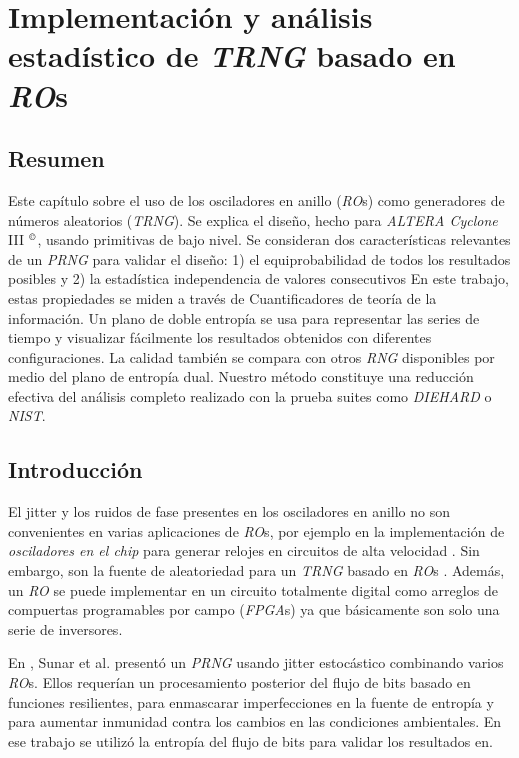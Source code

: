 \section{Implementación y análisis estadístico de \emph{TRNG} basado en \emph{RO}s}

\subsection{Resumen}

Este capítulo sobre el uso de los osciladores en anillo (\emph{RO}s) como generadores de números aleatorios (\emph{TRNG}).
Se explica el diseño, hecho para \emph{ALTERA Cyclone} III $^{\copyright}$, usando primitivas de bajo nivel.
Se consideran dos características relevantes de un \emph{PRNG} para validar el diseño: 1) el equiprobabilidad de todos los resultados posibles y 2) la estadística independencia de valores consecutivos En este trabajo, estas propiedades se miden a través de Cuantificadores de teoría de la información.
Un plano de doble entropía se usa para representar las series de tiempo y visualizar fácilmente los resultados obtenidos con diferentes configuraciones.
La calidad también se compara con otros \emph{RNG} disponibles por medio del plano de entropía dual.
Nuestro método constituye una reducción efectiva del análisis completo realizado con la prueba suites como \emph{DIEHARD} o \emph{NIST}.

\subsection{Introducción}
\label{sec:Intro}

El jitter y los ruidos de fase presentes en los osciladores en anillo no son convenientes en varias aplicaciones de \emph{RO}s, por ejemplo en la implementación de \emph{osciladores en el chip} para generar relojes en circuitos de alta velocidad \cite{Hajimiri1999, Mandal2010, Gupta2011}.
Sin embargo, son la fuente de aleatoriedad para un \emph{TRNG} basado en \emph{RO}s \cite{Sunar2007, Wold2009}.
Además, un \emph{RO} se puede implementar en un circuito totalmente digital como arreglos de compuertas programables por campo (\emph{FPGA}s) ya que básicamente son solo una serie de inversores.

En \cite{Sunar2007}, Sunar et al. presentó un \emph{PRNG} usando jitter estocástico combinando varios \emph{RO}s.
Ellos requerían un procesamiento posterior del flujo de bits basado en funciones resilientes, para enmascarar imperfecciones en la fuente de entropía y para aumentar inmunidad contra los cambios en las condiciones ambientales.
En ese trabajo se utilizó la entropía del flujo de bits para validar los resultados en.

